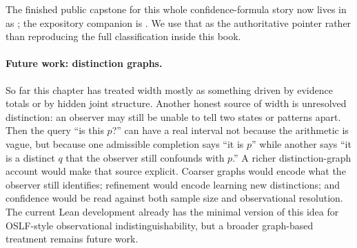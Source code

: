 \documentclass[11pt,openany]{report}
\begin{document}
The finished public capstone for this whole confidence-formula story now lives
in  as
; the expository companion is
.  We use that as the
authoritative pointer rather than reproducing the full classification inside
this book.

\paragraph{Future work: distinction graphs.}
So far this chapter has treated width mostly as something driven by evidence
totals or by hidden joint structure.  Another honest source of width is
unresolved distinction: an observer may still be unable to tell two states or
patterns apart.  Then the query ``is this $p$?'' can have a real interval not
because the arithmetic is vague, but because one admissible completion says
``it is $p$'' while another says ``it is a distinct $q$ that the observer still
confounds with $p$.''  A richer distinction-graph account would make that
source explicit.  Coarser graphs would encode what the observer still
identifies; refinement would encode learning new distinctions; and confidence
would be read against both sample size and observational resolution.  The
current Lean development already has the minimal version of this idea for
OSLF-style observational indistinguishability, but a broader graph-based
treatment remains future work.
\end{document}
